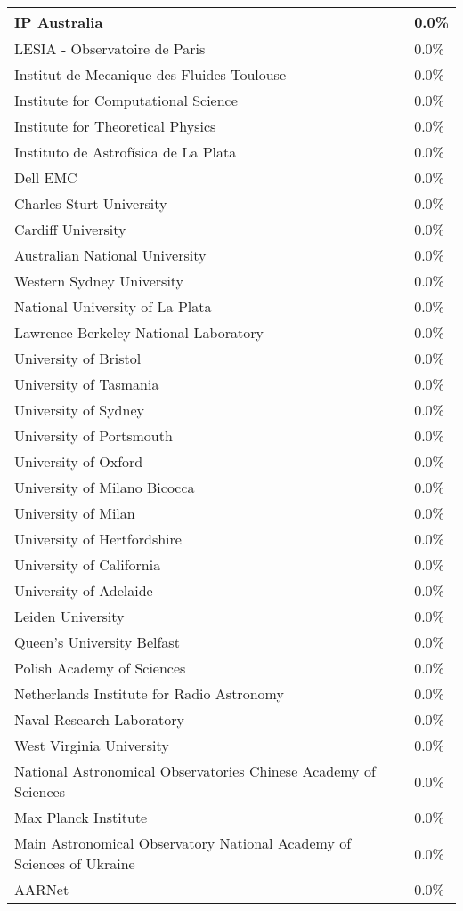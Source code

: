 \documentclass{article}%
\begin{document}
\begin{longtabu}{X[l] X[r]}
\hline%
IP Australia&0.0\%\\%
\hline%
LESIA {-} Observatoire de Paris&0.0\%\\%
\hline%
Institut de Mecanique des Fluides Toulouse&0.0\%\\%
\hline%
Institute for Computational Science&0.0\%\\%
\hline%
Institute for Theoretical Physics&0.0\%\\%
\hline%
Instituto de Astrofísica de La Plata&0.0\%\\%
\hline%
Dell EMC&0.0\%\\%
\hline%
Charles Sturt University&0.0\%\\%
\hline%
Cardiff University&0.0\%\\%
\hline%
Australian National University&0.0\%\\%
\hline%
Western Sydney University&0.0\%\\%
\hline%
National University of La Plata&0.0\%\\%
\hline%
Lawrence Berkeley National Laboratory&0.0\%\\%
\hline%
University of Bristol&0.0\%\\%
\hline%
University of Tasmania&0.0\%\\%
\hline%
University of Sydney&0.0\%\\%
\hline%
University of Portsmouth&0.0\%\\%
\hline%
University of Oxford&0.0\%\\%
\hline%
University of Milano Bicocca&0.0\%\\%
\hline%
University of Milan&0.0\%\\%
\hline%
University of Hertfordshire&0.0\%\\%
\hline%
University of California&0.0\%\\%
\hline%
University of Adelaide&0.0\%\\%
\hline%
Leiden University&0.0\%\\%
\hline%
Queen's University Belfast&0.0\%\\%
\hline%
Polish Academy of Sciences&0.0\%\\%
\hline%
Netherlands Institute for Radio Astronomy&0.0\%\\%
\hline%
Naval Research Laboratory&0.0\%\\%
\hline%
West Virginia University&0.0\%\\%
\hline%
National Astronomical Observatories Chinese Academy of Sciences&0.0\%\\%
\hline%
Max Planck Institute&0.0\%\\%
\hline%
Main Astronomical Observatory National Academy of Sciences of Ukraine&0.0\%\\%
\hline%
AARNet&0.0\%\\%
\hline%
\end{longtabu}%
\end{document}

